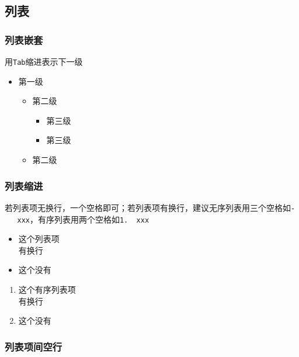 \documentclass[]{article}
\providecommand{\tightlist}{%
  \setlength{\itemsep}{0pt}\setlength{\parskip}{0pt}}
\begin{document}
\hypertarget{section-16}{%
\subsection{列表}\label{section-16}}

\hypertarget{section-17}{%
\subsubsection{列表嵌套}\label{section-17}}

用\texttt{Tab}缩进表示下一级

\begin{itemize}
\tightlist
\item
  第一级

  \begin{itemize}
  \tightlist
  \item
    第二级

    \begin{itemize}
    \tightlist
    \item
      第三级
    \item
      第三级
    \end{itemize}
  \item
    第二级
  \end{itemize}
\end{itemize}

\hypertarget{section-18}{%
\subsubsection{列表缩进}\label{section-18}}

若列表项无换行，一个空格即可；若列表项有换行，建议无序列表用三个空格如\texttt{-\ \ \ xxx}，有序列表用两个空格如\texttt{1.\ \ xxx}

\begin{itemize}
\tightlist
\item
  这个列表项\\
  有换行
\item
  这个没有
\end{itemize}

\begin{enumerate}
\def\labelenumi{\arabic{enumi}.}
\tightlist
\item
  这个有序列表项\\
  有换行
\item
  这个没有
\end{enumerate}

\hypertarget{section-19}{%
\subsubsection{列表项间空行}\label{section-19}}
\end{document}
